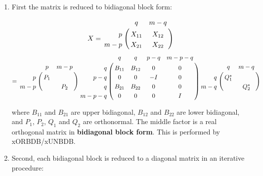 \begin{enumerate}

\item First the matrix is reduced to bidiagonal block form:

\begin{eqnarray*}
X  =  \bordermatrix{        &     q           &    m-q   \cr
                              \hfill   p   & X_{11} & X_{12} \cr
                              \hfill m-p & X_{21} & X_{22} }
\end{eqnarray*}
\begin{eqnarray*} 
     = \bordermatrix{         &    p     &    m-p   \cr
                              \hfill   p   & P_{1} &             \cr
                              \hfill m-p &            & P_{2}  }
            \bordermatrix{            &       q      &      q      &  p-q  & m-p-q \cr
                              \hfill     q    &   B_{11} & B_{12} &    0   &      0    \cr 
                              \hfill   p-q  &    0          & 0          &   -I    &      0   \cr 
                              \hfill     q    &  B_{21}  & B_{22} &    0   &      0   \cr
                              \hfill m-p-q &  0           & 0           &    0   &      I }
           \bordermatrix{        &     q            &    m-q   \cr
                              \hfill   q   & Q_{1}^* &             \cr
                              \hfill m-q &                 & Q_{2}^*  }
 \end{eqnarray*}

where $B_{11}$ and $B_{21}$ are upper bidiagonal, $B_{12}$ and $B_{22}$ are lower bidiagonal, 
and $P_{1}$, $P_{2}$, $Q_{1}$ and $Q_{2}$ are orthonormal.
The middle factor is a real orthogonal matrix in {\bf bidiagonal block form}.
This is performed by xORBDB/xUNBDB.

\item Second, each bidiagonal block is reduced to a diagonal matrix in an iterative procedure:


\end{enumerate}
